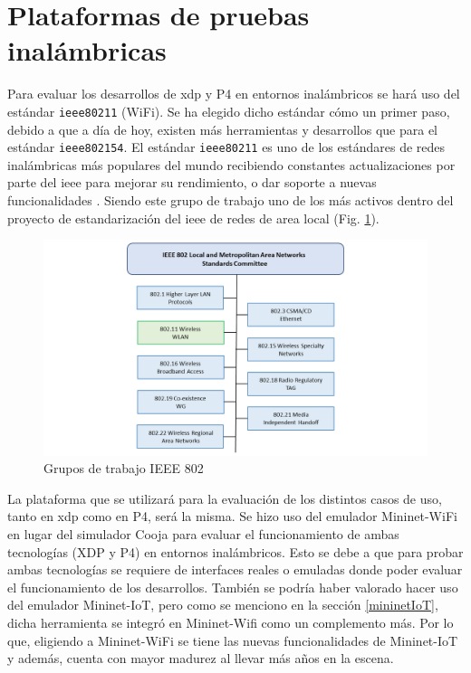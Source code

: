 \section{Plataformas de pruebas inalámbricas}


Para evaluar los desarrollos de \gls{xdp} y P4 en entornos  inalámbricos se hará uso del estándar \texttt{ieee80211} (WiFi). Se ha elegido dicho estándar cómo un primer paso, debido a que a día de hoy, existen más herramientas y desarrollos que para el estándar \texttt{ieee802154}. El estándar \texttt{ieee80211} es uno de los estándares de redes inalámbricas más populares del mundo recibiendo constantes actualizaciones por parte del \gls{ieee} para mejorar su rendimiento, o dar soporte a nuevas funcionalidades \cite{gast2005802}. Siendo este grupo de trabajo uno de los más activos dentro del proyecto de estandarización del \gls{ieee} de redes de area local (Fig. \ref{fig:ieee802}).  \\
\par

\begin{figure}[ht]
    \centering
    \includegraphics[width=15.5cm]{archivos/img/analisis/802_X_estandares_2.png}
    \caption{Grupos de trabajo IEEE 802}
    \label{fig:ieee802}
\end{figure}


La plataforma que se utilizará para la evaluación de los distintos casos de uso, tanto en \gls{xdp} como en P4, será la misma. Se hizo uso del emulador Mininet-WiFi en lugar del simulador Cooja para evaluar el funcionamiento de ambas tecnologías (XDP y P4) en entornos  inalámbricos. Esto se debe a que para probar ambas tecnologías se requiere de interfaces reales o emuladas donde poder evaluar el funcionamiento de los desarrollos. También se podría haber valorado hacer uso del emulador Mininet-IoT, pero como se menciono en la sección \ref{mininetIoT}, dicha herramienta se integró en Mininet-Wifi como un complemento más. Por lo que, eligiendo a Mininet-WiFi se tiene las nuevas funcionalidades de Mininet-IoT y además, cuenta con mayor madurez al llevar más años en la escena.\\


